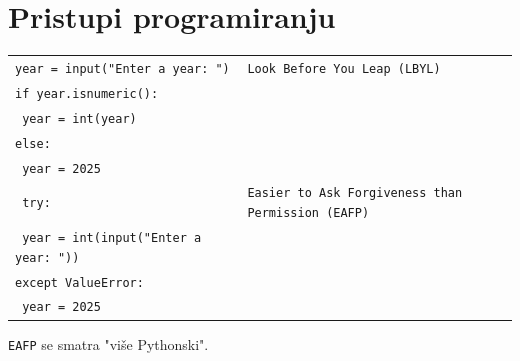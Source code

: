 \documentclass[10pt]{article}
\begin{document}
    \section*{\color{NavyBlue} Pristupi programiranju}
    \begin{tabular}{|>{\tt}p{9.00cm}|>{}p{15.50cm}|}
        \hline
        year = input("Enter a year: ") & \texttt{Look Before You Leap (LBYL)} \\
        if year.isnumeric(): & \\
        \hspace{5mm} year = int(year) & \\
        else: & \\
        \hspace{5mm} year = 2025 & \\
        \hline
        try: & \texttt{Easier to Ask Forgiveness than Permission (EAFP)} \\
        \hspace{5mm} year = int(input("Enter a year: ")) & \\
        except ValueError: & \\
        \hspace{5mm} year = 2025 & \\
        \hline
    \end{tabular}
    \begin{center}
        \texttt{EAFP} se smatra "više Pythonski".
    \end{center}
\end{document}
